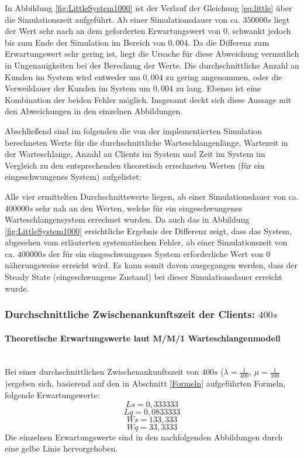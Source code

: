 In Abbildung \ref{fig:LittleSystem1000} ist der Verlauf der Gleichung \ref{eq:little} über die Simulationszeit aufgeführt. Ab einer Simulationsdauer von ca. $350000s$ liegt der Wert sehr nach an dem geforderten Erwartungswert von $0$, schwankt jedoch bis zum Ende der Simulation im Bereich von $0,004$. Da die Differenz zum Erwartungswert sehr gering ist, liegt die Ursache für diese Abweichung vermutlich in Ungenauigkeiten bei der Berechung der Werte. Die durchschnittliche Anzahl an Kunden im System wird entweder um $0,004$ zu gering angenommen, oder die Verweildauer der Kunden im System um $0,004$ zu lang. Ebenso ist eine Kombination der beiden Fehler möglich. Insgesamt deckt sich diese Aussage mit den Abweichungen in den einzelnen Abbildungen.

Abschließend sind im folgenden die von der implementierten Simulation berechneten Werte für die durchschnittliche Warteschlangenlänge, Wartezeit in der Warteschlange, Anzahl an Clients im System und Zeit im System im Vergleich zu den entsprechenden theoretisch errechneten Werten (für ein eingeschwungenes System) aufgelistet:


Alle vier ermittelten Durchschnittswerte liegen, ab einer Simulationsdauer von ca. $400000s$ sehr nah an den Werten, welche für ein eingeschwungenes Warteschlangensystem errechnet wurden. Da auch das in Abbildung  \ref{fig:LittleSystem1000} ersichtliche Ergebnis der Differenz zeigt, dass das System, abgesehen vom erläuterten systematischen Fehler, ab einer Simulationszeit von ca. $400000s$ der für ein eingeschwungenes System erforderliche Wert von $0$ näherungsweise erreicht wird. Es kann somit davon ausgegangen werden, dass der Steady State (eingeschwungene Zustand) bei dieser Simulationsdauer erreicht wurde.

\subsubsection{Durchschnittliche Zwischenankunftszeit der Clients: $400s$}
\paragraph{Theoretische Erwartungswerte laut M/M/1 Warteschlangenmodell}
\label{FormenlnMM1}
\\
Bei einer durchschnittlichen Zwischenankunftszeit von $400s$ ($\lambda=\frac{1}{400}$, $\mu=\frac{1}{100}$)ergeben sich, basierend auf den in Abschnitt \ref{Formeln} aufgeführten Formeln, folgende Erwartungswerte:
\begin{equation}
Ls=0,333333
\end{equation}
\begin{equation}
Lq=0,0833333
\end{equation}
\begin{equation}
Ws=133,333
\end{equation}
\begin{equation}
Wq=33,3333
\end{equation}
Die einzelnen Erwartungswerte sind in den nachfolgenden Abbildungen durch eine gelbe Linie hervorgehoben.

